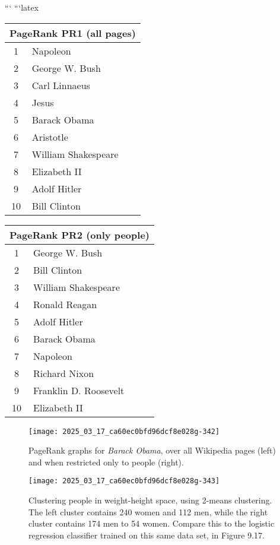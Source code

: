 \documentclass[10pt]{article}
\begin{document}
```
```latex
\begin{table}[h]
\centering
\begin{tabular}{|cl|}
\hline
\multicolumn{2}{|c|}{\textbf{PageRank PR1 (all pages)}} \\
\hline
1 & Napoleon\index{Napoleon} \\
2 & George W. Bush \\
3 & Carl Linnaeus \\
4 & Jesus\index{Jesus} \\
5 & Barack Obama \\
6 & Aristotle\index{Aristotle}\index{Aristotle} \\
7 & William Shakespeare \\
8 & Elizabeth II\index{Elizabeth II} \\
9 & Adolf Hitler \\
10 & Bill Clinton \\
\hline
\end{tabular}
\end{table}

\begin{table}[h]
\centering
\begin{tabular}{|cl|}
\hline
\multicolumn{2}{|c|}{\textbf{PageRank PR2 (only people)}} \\
\hline
1 & George W. Bush \\
2 & Bill Clinton \\
3 & William Shakespeare \\
4 & Ronald Reagan \\
5 & Adolf Hitler \\
6 & Barack Obama \\
7 & Napoleon \\
8 & Richard Nixon \\
9 & Franklin D. Roosevelt \\
10 & Elizabeth II \\
\hline
\end{tabular}
\end{table}

\begin{figure}[h]
\centering
\texttt{[image: 2025\_03\_17\_ca60ec0bfd96dcf8e028g-342]}
\caption{PageRank graphs for \textit{Barack Obama}, over all Wikipedia pages (left) and when restricted only to people (right).}
\end{figure}

\begin{figure}[h]
\centering
\texttt{[image: 2025\_03\_17\_ca60ec0bfd96dcf8e028g-343]}
\caption{Clustering people in weight-height space, using 2-means clustering. The left cluster contains 240 women and 112 men, while the right cluster contains 174 men to 54 women. Compare this to the logistic regression classifier trained on this same data set, in Figure 9.17.}
\end{figure}
\end{document}
